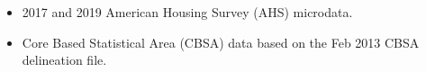 \begin{itemize}
\item 2017 and 2019 American Housing Survey (AHS) microdata.
\item Core Based Statistical Area (CBSA) data based on the Feb 2013 CBSA delineation file.
\end{itemize}
